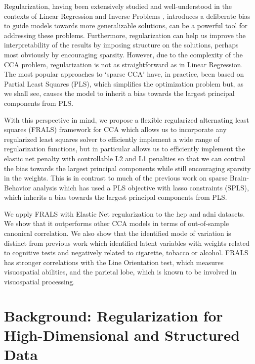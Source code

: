 Regularization, having been extensively studied and well-understood in the contexts of Linear Regression and Inverse Problems \citep{engl1996regularization}, introduces a deliberate bias to guide models towards more generalizable solutions, can be a powerful tool for addressing these problems.
Furthermore, regularization can help us improve the interpretability of the results by imposing structure on the solutions, perhaps most obviously by encouraging sparsity\citep{bzdok2019towards}.
However, due to the complexity of the CCA problem, regularization is not as straightforward as in Linear Regression.
The most popular approaches to `sparse CCA' have, in practice, been based on Partial Least Squares (PLS), which simplifies the optimization problem but, as we shall see, causes the model to inherit a bias towards the largest principal components from PLS.

With this perspective in mind, we propose a flexible regularized alternating least squares (FRALS) framework for CCA which allows us to incorporate any regularized least squares solver to efficiently implement a wide range of regularization functions, but in particular allows us to efficiently implement the elastic net penalty with controllable L2 and L1 penalties so that we can control the bias towards the largest principal components while still encouraging sparsity in the weights.
This is in contrast to much of the previous work on sparse Brain-Behavior analysis which has used a PLS objective with lasso constraints (SPLS), which inherits a bias towards the largest principal components from PLS.

We apply FRALS with Elastic Net regularization to the \acrshort{hcp} and \acrshort{adni} datasets.
We show that it outperforms other CCA models in terms of out-of-sample canonical correlation.
We also show that the identified mode of variation is distinct from previous work which identified latent variables with \gls{weights} related to cognitive tests and negatively related to cigarette, tobacco or alcohol\citep{smith2015positive}.
FRALS has stronger correlations with the Line Orientation test, which measures visuospatial abilities, and the parietal lobe, which is known to be involved in visuospatial processing.


\section{Background: Regularization for High-Dimensional and Structured Data}\label{sec:background}

